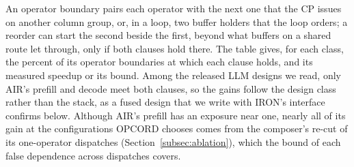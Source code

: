 An operator boundary pairs each operator with the next one that the CP issues on another column group, or, in a loop, two buffer holders that the loop orders; a reorder can start the second beside the first, beyond what buffers on a shared route let through, only if both clauses hold there. The table gives, for each class, the percent of its operator boundaries at which each clause holds, and its measured speedup or its bound.
Among the released LLM designs we read, only AIR's prefill and decode meet both clauses, so the gains follow the design class rather than the stack, as a fused design that we write with IRON's interface confirms below.
Although AIR's prefill has an exposure near one, nearly all of its gain at the configurations OPCORD chooses comes from the composer's re-cut of its one-operator dispatches (Section~\ref{subsec:ablation}), which the bound of each false dependence across dispatches covers.

